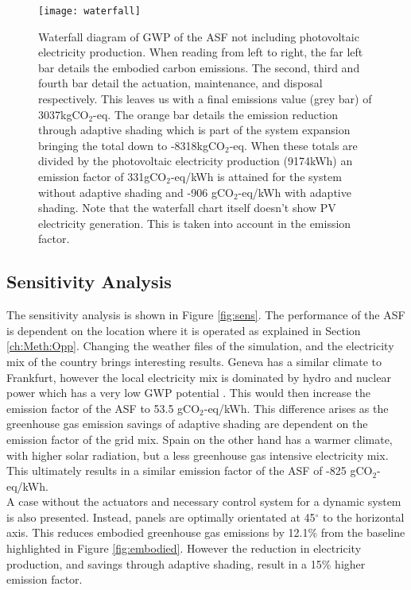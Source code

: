 \begin{figure}[H]
\begin{center}
\texttt{[image: waterfall]}
\caption{Waterfall diagram of GWP of the ASF not including photovoltaic electricity production. When reading from left to right, the far left bar details the embodied carbon emissions. The second, third and fourth bar detail the actuation, maintenance, and disposal respectively. This leaves us with a final emissions value (grey bar) of 3037kgCO$_2$-eq. The orange bar details the emission reduction through adaptive shading which is part of the system expansion bringing the total down to -8318kgCO$_2$-eq. When these totals are divided by the photovoltaic electricity production (9174kWh) an emission factor of 331gCO$_2$-eq/kWh is attained for the system without adaptive shading and -906 gCO$_2$-eq/kWh with adaptive shading. Note that the waterfall chart itself doesn't show PV electricity generation. This is taken into account in the emission factor.}

\label{fig:waterfall}
\end{center}
\end{figure}



\subsection{Sensitivity Analysis}


The sensitivity analysis is shown in Figure \ref{fig:sens}. The performance of the ASF is dependent on the location where it is operated as explained in Section \ref{ch:Meth:Opp}. Changing the weather files of the simulation, and the electricity mix of the country brings interesting results. Geneva has a similar climate to Frankfurt, however the local electricity mix is dominated by hydro and nuclear power which has a very low GWP potential \cite{itten2012life}. This would then increase the emission factor of the ASF to 53.5 gCO$_{2}$-eq/kWh. This difference arises as the greenhouse gas emission savings of adaptive shading are dependent on the emission factor of the grid mix.
Spain on the other hand has a warmer climate, with higher solar radiation, but a less greenhouse gas intensive electricity mix. This ultimately results in a similar emission factor of the ASF of -825 gCO$_{2}$-eq/kWh.\\


A case without the actuators and necessary control system for a dynamic system is also presented. Instead, panels are optimally orientated at 45$^{\circ}$ to the horizontal axis. This reduces embodied greenhouse gas emissions by 12.1\% from the baseline highlighted in Figure \ref{fig:embodied}. However the reduction in electricity production, and savings through adaptive shading, result in a 15\% higher emission factor.\\


